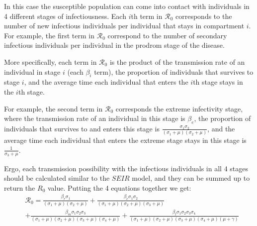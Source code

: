 In this case the susceptible population can come into contact with individuals in 4 different stages of infectiousness. Each $i$th term in $\mathcal R_0$ corresponds to the number of new infectious individuals per individual that stays in compartment $i$. For example, the first term in $\mathcal R_0$ correspond to the number of secondary infectious individuals per individual in the prodrom stage of the disease.\par
More specifically, each term in $\mathcal R_0$ is the product of the transmission rate of an individual in stage $i$ (each $\beta_i$ term), the proportion of individuals that survives to stage $i$, and the average time each individual that enters the $i$th stage stays in the $i$th stage.\par
For example, the second term in $\mathcal R_0$ corresponds the extreme infectivity stage, where the transmission rate of an individual in this stage is $\beta_e$, the proportion of individuals that survives to and enters this stage is $\frac{\sigma_1 \sigma_2}{(\sigma_1 + \mu)(\sigma_2 + \mu)}$, and the average time each individual that enters the extreme stage stays in this stage is $\frac{1}{\sigma_3 + \mu}$. \par
Ergo, each transmission possibility with the infectious individuals in all 4 stages should be calculated similar to the $SEIR$ model, and they can be summed up to return the $R_0$ value. Putting the 4 equations together we get:
\begin{align*}
&\mathcal R_0 = \frac{\beta_r \sigma_{1}}{{\left(\sigma_{1} + \mu\right)} {\left(\sigma_{2} + \mu\right)}} + \frac{\beta_e \sigma_{1} \sigma_{2}}{{\left(\sigma_{1} + \mu\right)} {\left(\sigma_{2} + \mu\right)} {\left(\sigma_{3} + \mu\right)}}\\ 
&+ \frac{\beta_m \sigma_{1} \sigma_{2} \sigma_{3}}{{\left(\sigma_{1} + \mu\right)} {\left(\sigma_{2} + \mu\right)} {\left(\sigma_{3} + \mu\right)} {\left(\sigma_{4} + \mu\right)}} + \frac{\beta_l \sigma_{1} \sigma_{2} \sigma_{3} \sigma_{4}}{{\left(\sigma_{1} + \mu\right)} {\left(\sigma_{2} + \mu\right)} {\left(\sigma_{3} + \mu\right)} {\left(\sigma_{4} + \mu\right)} {\left(\mu + \gamma\right)}}
\end{align*}
